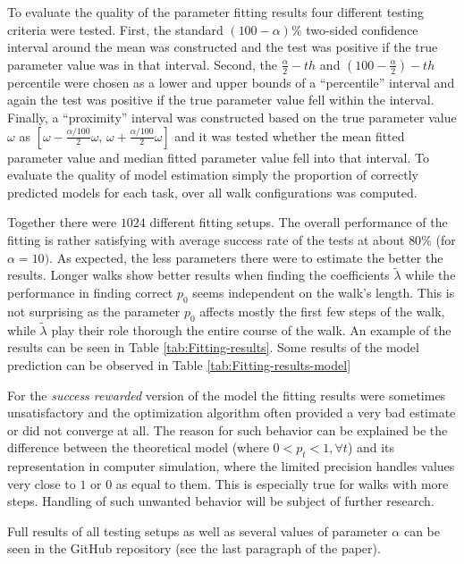 \documentclass{amsart}
\theoremstyle{definition}
\theoremstyle{plain}
\theoremstyle{plain}
\theoremstyle{plain}
\numberwithin{equation}{section}
\begin{document}
To evaluate the quality of the parameter fitting results four different testing criteria were tested. First, the standard $(100-\alpha)\%$ two-sided confidence interval around the mean was constructed and the test was positive if the true parameter value was in that interval. Second, the $\frac{\alpha}{2}-th$ and $(100-\frac{\alpha}{2})-th$ percentile were chosen as a lower and upper bounds of a ``percentile'' interval and again the test was positive if the true parameter value fell within the interval. Finally, a ``proximity'' interval was constructed based on the true parameter value $\omega$ as $[\omega-\frac{\alpha/100}{2}\omega,\,\omega+\frac{\alpha/100}{2}\omega]$ and it was tested whether the mean fitted parameter value and median fitted parameter value fell into that interval. To evaluate the quality of model estimation simply the proportion of correctly predicted models for each task, over all walk configurations was computed.

Together there were $1024$ different fitting setups. The overall performance of the fitting is rather satisfying with average success rate of the tests at about $80\%$ (for $\alpha=10)$. As expected, the less parameters there were to estimate the better the results. Longer walks show better results when finding the coefficients $\tilde{\lambda}$ while the performance in finding correct $p_0$ seems independent on the walk's length. This is not surprising as the parameter $p_0$ affects mostly the first few steps of the walk, while $\tilde{\lambda}$ play their role thorough the entire course of the walk. An example of the results can be seen in Table \ref{tab:Fitting-results}. Some results of the model prediction can be observed in Table \ref{tab:Fitting-results-model}

For the \emph{success rewarded} version of the model the fitting results were sometimes unsatisfactory and the optimization algorithm often provided a very bad estimate or did not converge at all. The reason for such behavior can be explained be the difference between the theoretical model (where $0<p_t<1, \forall t$) and its representation in computer simulation, where the limited precision handles values very close to $1$ or $0$ as equal to them. This is especially true for walks with more steps. Handling of such unwanted behavior will be subject of further research.

Full results of all testing setups as well as several values of parameter $\alpha$ can be seen in the GitHub repository (see the last paragraph of the paper). 
\end{document}
